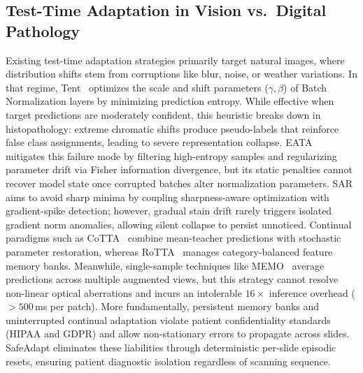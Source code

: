 \documentclass[journal]{IEEEtran}
\begin{document}
\subsection{Test-Time Adaptation in Vision vs.\ Digital Pathology}
Existing test-time adaptation strategies primarily target natural images, where distribution shifts stem from corruptions like blur, noise, or weather variations. In that regime, Tent~\cite{wang2021tent} optimizes the scale and shift parameters ($\gamma, \beta$) of Batch Normalization layers by minimizing prediction entropy. While effective when target predictions are moderately confident, this heuristic breaks down in histopathology: extreme chromatic shifts produce pseudo-labels that reinforce false class assignments, leading to severe representation collapse. EATA~\cite{niu2022eata} mitigates this failure mode by filtering high-entropy samples and regularizing parameter drift via Fisher information divergence, but its static penalties cannot recover model state once corrupted batches alter normalization parameters. SAR~\cite{niu2023sar} aims to avoid sharp minima by coupling sharpness-aware optimization with gradient-spike detection; however, gradual stain drift rarely triggers isolated gradient norm anomalies, allowing silent collapse to persist unnoticed. Continual paradigms such as CoTTA~\cite{wang2022cotta} combine mean-teacher predictions with stochastic parameter restoration, whereas RoTTA~\cite{yuan2023rotta} manages category-balanced feature memory banks. Meanwhile, single-sample techniques like MEMO~\cite{zhang2022memo} average predictions across multiple augmented views, but this strategy cannot resolve non-linear optical aberrations and incurs an intolerable $16\times$ inference overhead ($>500$\,ms per patch). More fundamentally, persistent memory banks and uninterrupted continual adaptation violate patient confidentiality standards (HIPAA and GDPR) and allow non-stationary errors to propagate across slides. SafeAdapt eliminates these liabilities through deterministic per-slide episodic resets, ensuring patient diagnostic isolation regardless of scanning sequence.
\end{document}
